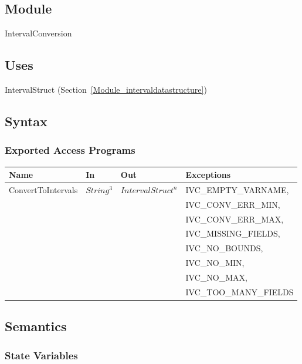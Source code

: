 \documentclass[12pt, titlepage]{article}
\begin{document}
\subsection{Module}

IntervalConversion

\subsection{Uses}

IntervalStruct (Section~\ref{Module_intervaldatastructure})

\subsection{Syntax}

\subsubsection{Exported Access Programs}

\begin{center}
	\begin{tabular}{p{3.3cm} p{2cm} p{3cm} p{5cm}}
		\hline
		\textbf{Name} & \textbf{In} & \textbf{Out} & \textbf{Exceptions} \\
		\hline
		\multirow{8}{3cm}{ConvertToIntervals} & \multirow{8}{2.3cm}{$String^3$} 
		& \multirow{8}{3cm}{$IntervalStruct^n$} & IVC\_EMPTY\_VARNAME, \\
		& & & IVC\_CONV\_ERR\_MIN, \\
		& & & IVC\_CONV\_ERR\_MAX, \\
		& & & IVC\_MISSING\_FIELDS, \\
		& & & IVC\_NO\_BOUNDS, \\
		& & & IVC\_NO\_MIN, \\
		& & & IVC\_NO\_MAX, \\
		& & & IVC\_TOO\_MANY\_FIELDS \\
		\hline
	\end{tabular}
\end{center}

\subsection{Semantics}

\subsubsection{State Variables}
\end{document}
